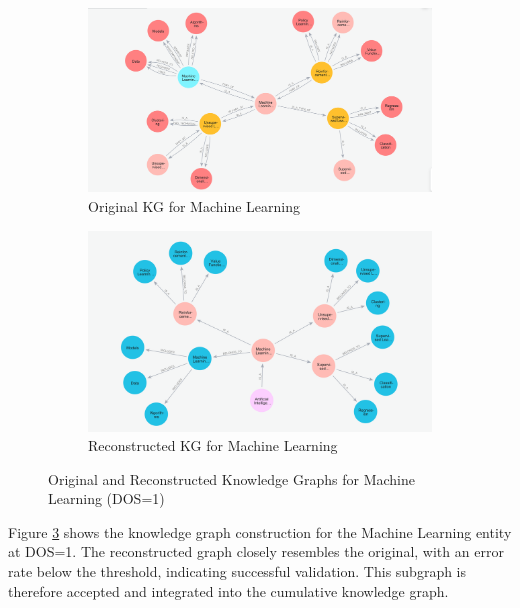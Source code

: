 \documentclass[11pt]{article}
\begin{document}
\begin{figure}[H]
    \centering
    \begin{subfigure}[b]{0.48\columnwidth}
        \centering
        \includegraphics[width=\textwidth]{img/original_dos1_Machine_Learning.png}
        \caption{Original KG for Machine Learning}
        \label{fig:dos1_ml_original}
    \end{subfigure}
    \hfill
    \begin{subfigure}[b]{0.48\columnwidth}
        \centering
        \includegraphics[width=\textwidth]{img/reconstructed_dos1_Machine_Learning.png}
        \caption{Reconstructed KG for Machine Learning}
        \label{fig:dos1_ml_reconstructed}
    \end{subfigure}
    \caption{Original and Reconstructed Knowledge Graphs for Machine Learning (DOS=1)}
    \label{fig:comparison_dos1_ml}
\end{figure}

Figure \ref{fig:comparison_dos1_ml} shows the knowledge graph construction for the Machine Learning entity at DOS=1. The reconstructed graph closely resembles the original, with an error rate below the threshold, indicating successful validation. This subgraph is therefore accepted and integrated into the cumulative knowledge graph.
\end{document}
